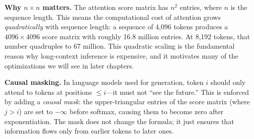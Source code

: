 \textbf{Why $n \times n$ matters.}\hspace{1em} The attention score matrix has $n^2$ entries, where $n$ is the sequence length. This means the computational cost of attention grows \emph{quadratically} with sequence length: a sequence of 4,096 tokens produces a $4096 \times 4096$ score matrix with roughly 16.8 million entries. At 8,192 tokens, that number quadruples to 67 million. This quadratic scaling is the fundamental reason why long-context inference is expensive, and it motivates many of the optimizations we will see in later chapters.

\begin{notebox}
\textbf{Causal masking.} In language models used for generation, token $i$ should only attend to tokens at positions $\leq i$---it must not ``see the future.'' This is enforced by adding a \emph{causal mask}: the upper-triangular entries of the score matrix (where $j > i$) are set to $-\infty$ before softmax, causing them to become zero after exponentiation. The mask does not change the formula; it just ensures that information flows only from earlier tokens to later ones.
\end{notebox}

